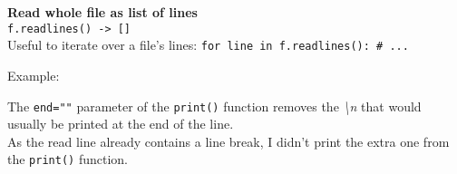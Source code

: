 \textbf{Read whole file as list of lines} \\
\texttt{f.readlines() -> []} \\
Useful to iterate over a file's lines: \texttt{for line in f.readlines(): # ...}

Example:

The \texttt{end=""} parameter of the \texttt{print()} function
removes the \textit{\textbackslash n} that would usually be printed at the end of the line. \\
As the read line already contains a line break, I didn't print the extra one from the
\texttt{print()} function.